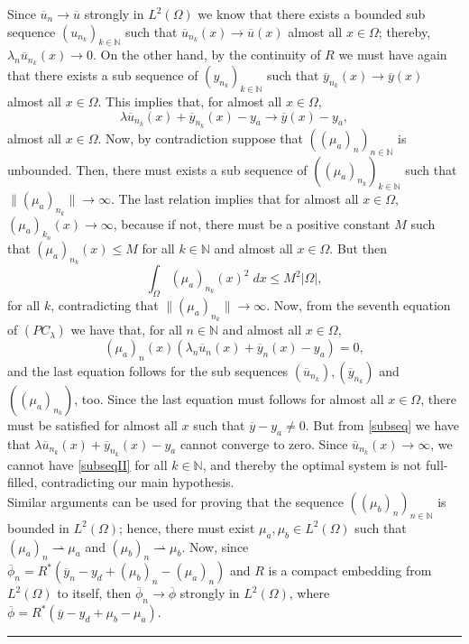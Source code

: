 \documentclass[11pt,a4paper]{amsart}
\newcommand{\kw}{\rule{2mm}{2mm}}
\newcommand{\om}{\Omega}
\renewenvironment{proof}{{Proof.}}{\hfill\kw}
\newcommand{\norm}[1]{\lVert #1 \rVert}
\begin{document}
\begin{proof}
Since $\overline{u}_n\to \overline{u}$ strongly in $L^2(\om)$ we know that there exists a bounded sub sequence $(u_{n_k})_{k\in\mathbb{N}}$ such that $\overline{u}_{n_k}(x)\to \overline{u}(x)$ almost all $x\in \om$; thereby, $\lambda_n \overline{u}_{n_k}(x)\to 0$. On the other hand, by the continuity of $R$ we must have again that there exists a sub sequence of $(y_{n_k})_{k\in \mathbb{N}}$ such that $\overline{y}_{n_k}(x)\to \overline{y}(x)$ almost all $x\in \om$. This implies that, for almost all $x\in \Omega$,
\begin{equation}\label{subseq}
\lambda\overline{u}_{n_k}(x)+\overline{y}_{n_k}(x)-y_a\to \overline{y}(x)-y_a,
\end{equation}
almost all $x\in \om$. Now, by contradiction suppose that $((\mu_a)_n)_{n\in \mathbb{N}}$ is unbounded. Then, there must exists a sub sequence of $((\mu_a)_{n_k})_{k\in\mathbb{N}}$ such that $\norm{(\mu_a)_{n_k}}\to\infty$. The last relation implies that for almost all $x\in \Omega$, $(\mu_a)_{k_n}(x)\to \infty$, because if not, there must be a positive constant $M$ such that $(\mu_a)_{n_k}(x)\le M$ for all $k\in\mathbb{N}$ and almost all $x\in \om$. But then
\[
\int_{\om}(\mu_a)_{n_k}(x)^2\;dx\le M^2|\om|,
\]
for all $k$, contradicting that $\norm{(\mu_a)_{n_k}}\to\infty$. Now, from the seventh equation of $(PC_{\lambda})$ we have that, for all $n\in\mathbb{N}$ and almost all $x\in \Omega$,
\begin{equation}\label{subseqII}
(\mu_a)_n(x)(\lambda_n\overline{u}_n(x)+\overline{y}_n(x)-y_a)=0,
\end{equation}
and the last equation follows for the sub sequences $(\overline{u}_{n_k}), (\overline{y}_{n_k})$ and $((\mu_a)_{n_k})$, too. Since the last equation must follows for almost all $x\in \Omega$, there must be satisfied for almost all $x$ such that $\overline{y}-y_a\ne 0$. But from \eqref{subseq} we have that $\lambda\overline{u}_{n_k}(x)+\overline{y}_{n_k}(x)-y_a$ cannot converge to zero. Since $\overline{u}_{n_k}(x)\to \infty$, we cannot have \eqref{subseqII} for all $k\in \mathbb{N}$, and thereby the optimal system is not full-filled, contradicting our main hypothesis.\\

Similar arguments can be used for proving that the sequence $((\mu_b)_n)_{n\in\mathbb{N}}$ is bounded in $L^2(\Omega)$; hence, there must exist $\mu_a, \mu_b\in L^2(\Omega)$ such that $(\mu_a)_{n}\rightharpoonup \mu_a$ and $(\mu_b)_{n}\rightharpoonup \mu_b$. Now, since $\overline{\phi}_{n}=R^{*}(\overline{y}_n-y_d+(\mu_b)_n-(\mu_a)_n)$ and $R$ is a compact embedding from $L^2(\om)$ to itself, then $\overline{\phi}_{n}\to \overline{\phi}$ strongly in $L^2(\om)$, where $\overline{\phi}=R^*(\overline{y}-y_d+\mu_b-\mu_a)$.\\


\end{proof}
\end{document}
